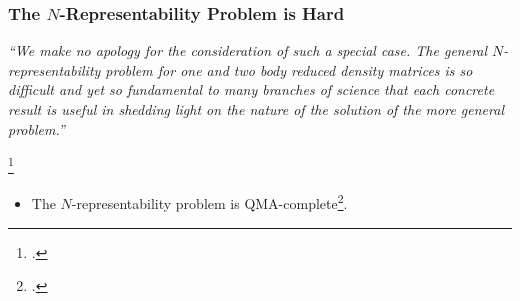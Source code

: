 \documentclass[
    9pt,
    hyperref={bookmarks=false, colorlinks=false}, %
    xcolor={dvipsnames},
]{beamer}
\begin{document}
\begin{frame}
    \frametitle{The $N$-Representability Problem is Hard}
    \begin{alertblock}{}
        \textit{``We make no apology for the consideration of such a special case. The general $N$-representability problem for one and two body reduced density matrices is so difficult and yet so fundamental to many branches of science that each concrete result is useful in shedding light on the nature of the solution of the more general problem.''}
        \hspace*{}
    \end{alertblock}
    \footcitetext{borland1972conditions}
    \begin{itemize}
        \item The $N$-representability problem is QMA-complete\footcite{liu2007quantum}.
    \end{itemize}
\end{frame}
\end{document}
